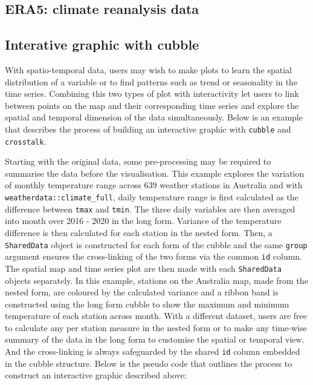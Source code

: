 \documentclass[
]{jss}
\begin{document}
\hypertarget{era5-climate-reanalysis-data}{%
\subsection{ERA5: climate reanalysis
data}\label{era5-climate-reanalysis-data}}

\newpage

\hypertarget{interative-graphic-with-cubble}{%
\subsection{Interative graphic with
cubble}\label{interative-graphic-with-cubble}}

With spatio-temporal data, users may wish to make plots to learn the
spatial distribution of a variable or to find patterns such as trend or
seasonality in the time series. Combining this two types of plot with
interactivity let users to link between points on the map and their
corresponding time series and explore the spatial and temporal dimension
of the data simultaneously. Below is an example that describes the
process of building an interactive graphic with \texttt{cubble} and
\texttt{crosstalk}.

Starting with the original data, some pre-processing may be required to
summarise the data before the visualisation. This example explores the
variation of monthly temperature range across 639 weather stations in
Australia and with \texttt{weatherdata::climate\_full}, daily
temperature range is first calculated as the difference between
\texttt{tmax} and \texttt{tmin}. The three daily variables are then
averaged into month over 2016 - 2020 in the long form. Variance of the
temperature difference is then calculated for each station in the nested
form. Then, a \texttt{SharedData} object is constructed for each form of
the cubble and the same \texttt{group} argument ensures the
cross-linking of the two forms via the common \texttt{id} column. The
spatial map and time series plot are then made with each
\texttt{SharedData} objects separately. In this example, stations on the
Australia map, made from the nested form, are coloured by the calculated
variance and a ribbon band is constructed using the long form cubble to
show the maximum and minimum temperature of each station across month.
With a different dataset, users are free to calculate any per station
measure in the nested form or to make any time-wise summary of the data
in the long form to customise the spatial or temporal view. And the
cross-linking is always safeguarded by the shared \texttt{id} column
embedded in the cubble structure. Below is the pseudo code that outlines
the process to construct an interactive graphic described above:
\end{document}
